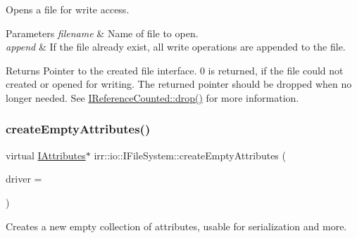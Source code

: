 Opens a file for write access. 


\begin{DoxyParams}{Parameters}
{\em filename} & Name of file to open. \\
\hline
{\em append} & If the file already exist, all write operations are appended to the file. \\
\hline
\end{DoxyParams}
\begin{DoxyReturn}{Returns}
Pointer to the created file interface. 0 is returned, if the file could not created or opened for writing. The returned pointer should be dropped when no longer needed. See \hyperlink{classirr_1_1IReferenceCounted_a03856a09355b89d178090c4a5f738543}{I\+Reference\+Counted\+::drop()} for more information. 
\end{DoxyReturn}
\mbox{\label{classirr_1_1io_1_1IFileSystem_a50f91cd88b926751367dac153c1cefd2}} 
\subsubsection{\texorpdfstring{create\+Empty\+Attributes()}{createEmptyAttributes()}\hspace{0.1cm}{\footnotesize\ttfamily [1/2]}}
{\footnotesize\ttfamily virtual \hyperlink{classirr_1_1io_1_1IAttributes}{I\+Attributes}$\ast$ irr\+::io\+::\+I\+File\+System\+::create\+Empty\+Attributes (\begin{DoxyParamCaption}\item[{\hyperlink{classirr_1_1video_1_1IVideoDriver}{video\+::\+I\+Video\+Driver} $\ast$}]{driver = {} }\end{DoxyParamCaption})\hspace{0.3cm}{\ttfamily [pure virtual]}}



Creates a new empty collection of attributes, usable for serialization and more. 


